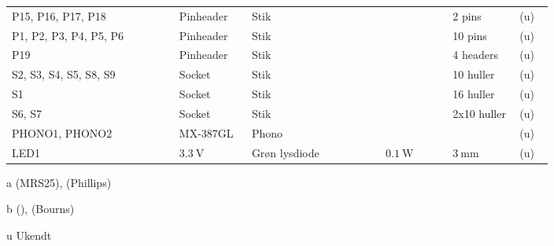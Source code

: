 \begin{table}[h!]
\begin{threeparttable}
\begin{tabular}{p{0.25\linewidth}p{0.1\linewidth}p{0.15\linewidth}p{0.05\linewidth}p{0.1\linewidth}p{0.1\linewidth}p{0.05\linewidth}}
P15, P16, P17, P18 & Pinheader & Stik &  &  & 2 pins & (u) \\
P1, P2, P3, P4, P5, P6 & Pinheader & Stik &  &  & 10 pins & (u) \\
P19 & Pinheader & Stik &  &  & 4 headers & (u) \\
S2, S3, S4, S5, S8, S9 & Socket & Stik &  &  & 10 huller & (u) \\
S1 & Socket & Stik &  &  & 16 huller & (u) \\
S6, S7 & Socket & Stik &  &  & 2x10 huller & (u) \\
PHONO1, PHONO2 & MX-387GL & Phono &  &  &  & (u) \\
LED1 & $\SI{3.3}{\volt}$ & Grøn lysdiode &  & $\SI{0.1}{\watt}$ & $\SI{3}{\milli\meter}$ & (u) \\
\hline
\bottomrule
\end{tabular}
\begin{tablenotes}
\item[a] (MRS25), (Phillips)
\item[b] (), (Bourns)
\item[u] Ukendt
\end{tablenotes}
\end{threeparttable}
\end{table} 
